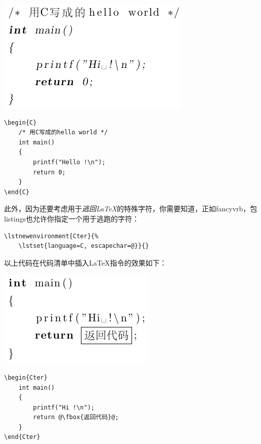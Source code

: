 \begin{codelist}[10.8]{
    \includegraphics{texs/chelloworld2}
}
\begin{verbatim}
\begin{C}
    /* 用C写成的hello world */
    int main()
    {
        printf("Hello !\n");
        return 0;
    }
\end{C}\end{verbatim}
\end{codelist}

此外，因为还要考虑用于\emph{逃回\LaTeX }的特殊字符，你需要知道，正如\textsf{fancyvrb}，包\textsf{listings}也允许你指定一个用于逃跑的字符：

\begin{dmd}
\begin{verbatim}
\lstnewenvironment{Cter}{% 
    \lstset{language=C, escapechar=@}}{}\end{verbatim}
\end{dmd}

以上代码在代码清单中插入\LaTeX 指令的效果如下：

\begin{codelist}[10.9]{
    \includegraphics{texs/chelloworld3}
}
\begin{verbatim}
\begin{Cter}
    int main()
    {
        printf("Hi !\n");
        return @\fbox{返回代码}@;
    } 
\end{Cter}\end{verbatim}
\end{codelist}


